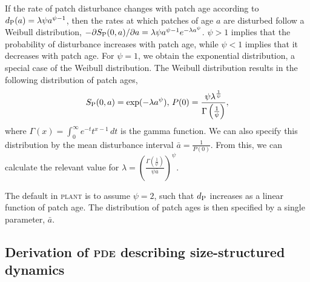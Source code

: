 \documentclass[10pt,twoside]{article}
\newcommand{\plant}{\textsc{plant}}
\begin{document}
If the rate of patch disturbance changes with patch age according to
\(d_{\rm P}(a) = \lambda \psi a^{\psi-1}\), then the rates at which
patches of age \(a\) are disturbed follow a Weibull distribution,
\(-\partial S_{\rm P}(0, a)/ \partial a = \lambda \psi a^{\psi -1}e^{-\lambda a^\psi}\).
\(\psi>1\) implies that the probability of disturbance increases with
patch age, while \(\psi<1\) implies that it decreases with
patch age. For \(\psi = 1\), we obtain the exponential distribution, a special
case of the Weibull distribution. The Weibull distribution results in the following
distribution of patch ages,
\[S_{\rm P}(0, a) = \exp(-\lambda a^\psi), \, P(0) = \frac{\psi \lambda^{\frac1{\psi}}}{\Gamma\left(\frac1{\psi}\right)},\]
where \(\Gamma(x) = \int_{0}^{\infty}e^{-t}t^{x-1} \, dt\) is the gamma function. We can
also specify this distribution by the mean  disturbance interval
\(\bar{a} = \frac1{P(0)}\). From this, we can calculate the relevant value for
\(\lambda = \left(\frac{\Gamma\left(\frac1{\psi}\right)}{\psi \bar{a}}\right)^{\psi}\).

The default in {\plant} is to assume $\psi=2$, such that \(d_{\rm P}\) increases as
a linear function of patch age. The distribution of patch ages is then specified by a
single parameter, $\bar{a}$.


\subsection{Derivation of \textsc{pde} describing size-structured
dynamics}\label{derivation-of-pde-describing-size-structured-dynamics}
\end{document}
